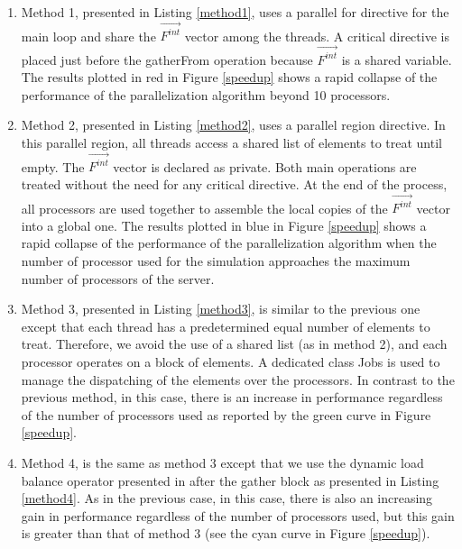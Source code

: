 \begin{enumerate}
\item Method 1, presented in Listing \ref{method1}, uses a parallel for directive for the main loop and share the $\overrightarrow{F^{int}}$ vector among the threads. A critical directive is placed just before the gatherFrom operation because $\overrightarrow{F^{int}}$ is a shared variable. The results plotted in red in Figure \ref{speedup} shows a rapid collapse of the performance of the parallelization algorithm beyond 10 processors.

\item Method 2, presented in Listing \ref{method2}, uses a parallel region directive. In this parallel region, all threads access a shared list of elements to treat until empty. The $\overrightarrow{F^{int}}$ vector is declared as private. Both main operations are treated without the need for any critical directive. At the end of the process, all processors are used together to assemble the local copies of the $\overrightarrow{F^{int}}$ vector into a global one. The results plotted in blue in Figure \ref{speedup} shows a rapid collapse of the performance of the parallelization algorithm when the number of processor used for the simulation approaches the maximum number of processors of the server.

\item Method 3, presented in Listing \ref{method3}, is similar to the previous one except that each thread has a predetermined equal number of elements to treat. Therefore, we avoid the use of a shared list (as in method 2), and each processor operates on a block of elements. A dedicated class Jobs is used to manage the dispatching of the elements over the processors. In contrast to the previous method, in this case, there is an increase in performance regardless of the number of processors used as reported by the green curve in Figure \ref{speedup}.

\item Method 4, is the same as method 3 except that we use the dynamic load balance operator presented in \cite{Pantale:2005} after the gather block as presented in Listing \ref{method4}. As in the previous case, in this case, there is also an increasing gain in performance regardless of the number of processors used, but this gain is greater than that of method 3 (see the cyan curve in Figure \ref{speedup}).

\end{enumerate}

